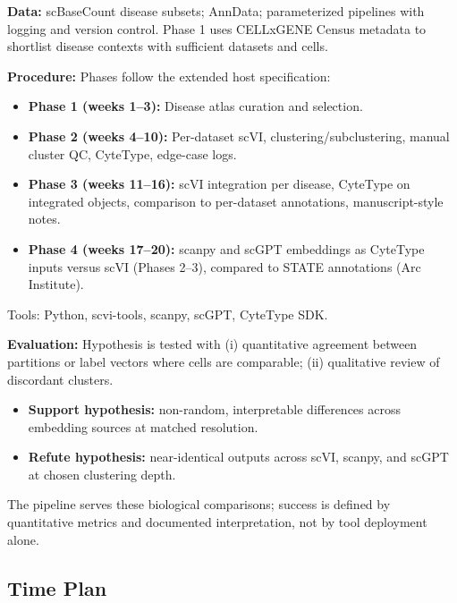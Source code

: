 \documentclass[12pt,a4paper]{article}
\begin{document}
\textbf{Data:} scBaseCount disease subsets; AnnData; parameterized pipelines with logging and version control. Phase 1 uses CELLxGENE Census metadata to shortlist disease contexts with sufficient datasets and cells.

\textbf{Procedure:} Phases follow the extended host specification:
\begin{itemize}
    \item \textbf{Phase 1 (weeks 1–3):} Disease atlas curation and selection.
    \item \textbf{Phase 2 (weeks 4–10):} Per-dataset scVI, clustering/subclustering, manual cluster QC, CyteType, edge-case logs.
    \item \textbf{Phase 3 (weeks 11–16):} scVI integration per disease, CyteType on integrated objects, comparison to per-dataset annotations, manuscript-style notes.
    \item \textbf{Phase 4 (weeks 17–20):} scanpy and scGPT embeddings as CyteType inputs versus scVI (Phases 2–3), compared to STATE annotations (Arc Institute).
\end{itemize}
Tools: Python, scvi-tools, scanpy, scGPT, CyteType SDK.

\textbf{Evaluation:} Hypothesis is tested with (i) quantitative agreement between partitions or label vectors where cells are comparable; (ii) qualitative review of discordant clusters.
\begin{itemize}
    \item \textbf{Support hypothesis:} non-random, interpretable differences across embedding sources at matched resolution.
    \item \textbf{Refute hypothesis:} near-identical outputs across scVI, scanpy, and scGPT at chosen clustering depth.
\end{itemize}
The pipeline serves these biological comparisons; success is defined by quantitative metrics and documented interpretation, not by tool deployment alone.

\subsection*{Time Plan}
\end{document}
